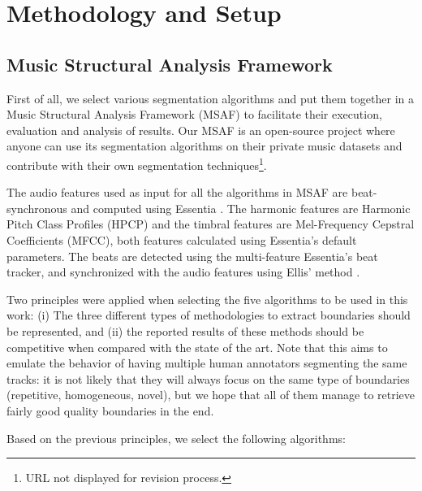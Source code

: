 \documentclass{article}
\begin{document}
\section{Methodology and Setup}\label{sec:prelExp}

\subsection{Music Structural Analysis Framework}

First of all, we select various segmentation algorithms and put them together in a Music Structural Analysis Framework (MSAF) to facilitate their execution, evaluation and analysis of results. 
Our MSAF is an open-source project where anyone can use its segmentation algorithms on their private music datasets and contribute with their own segmentation techniques\footnote{URL not displayed for revision process.}.


The audio features used as input for all the algorithms in MSAF are beat-synchronous and computed using Essentia \cite{Bogdanov2013}.
The harmonic features are Harmonic Pitch Class Profiles (HPCP) and the timbral features are Mel-Frequency Cepstral Coefficients (MFCC), both features calculated using Essentia's default parameters.
The beats are detected using the multi-feature Essentia's beat tracker, and synchronized with the audio features using Ellis' method \cite{Ellis2007}.

Two principles were applied when selecting the five algorithms to be used in this work: (i) The three different types of methodologies to extract boundaries should be represented, and (ii) the reported results of these methods should be competitive when compared with the state of the art.
Note that this aims to emulate the behavior of having multiple human annotators segmenting the same tracks: it is not likely that they will always focus on the same type of boundaries (repetitive, homogeneous, novel), but we hope that all of them manage to retrieve fairly good quality boundaries in the end.

Based on the previous principles, we select the following algorithms:
\end{document}
